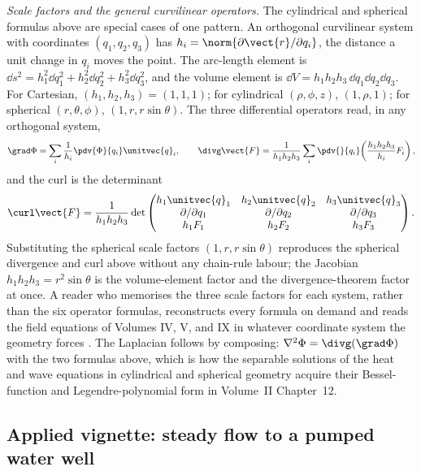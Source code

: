 \begin{mastery}
\textit{Scale factors and the general curvilinear operators.} The
cylindrical and spherical formulas above are special cases of one
pattern. An orthogonal curvilinear system with coordinates
$(q_{1}, q_{2}, q_{3})$ has 
$h_{i} = \norm{\partial\vect{r}/\partial q_{i}}$, the distance a unit
change in $q_{i}$ moves the point. The arc-length element is
$\dd s^{2} = h_{1}^{2}\dd q_{1}^{2} + h_{2}^{2}\dd q_{2}^{2} +
h_{3}^{2}\dd q_{3}^{2}$, and the volume element is
$\dd V = h_{1}h_{2}h_{3}\,\dd q_{1}\dd q_{2}\dd q_{3}$. For Cartesian,
$(h_{1}, h_{2}, h_{3}) = (1, 1, 1)$; for cylindrical $(\rho, \phi, z)$,
$(1, \rho, 1)$; for spherical $(r, \theta, \phi)$, $(1, r, r\sin\theta)$.
The three differential operators read, in any orthogonal system,
\[
\grad\Phi = \sum_{i}\frac{1}{h_{i}}\pdv{\Phi}{q_{i}}\unitvec{q}_{i},
\qquad
\divg\vect{F} = \frac{1}{h_{1}h_{2}h_{3}}\sum_{i}
  \pdv{}{q_{i}}\!\left(\frac{h_{1}h_{2}h_{3}}{h_{i}}F_{i}\right),
\]
and the curl is the determinant
\[
\curl\vect{F} = \frac{1}{h_{1}h_{2}h_{3}}\det
\begin{pmatrix}
h_{1}\unitvec{q}_{1} & h_{2}\unitvec{q}_{2} & h_{3}\unitvec{q}_{3} \\
\partial/\partial q_{1} & \partial/\partial q_{2} &
  \partial/\partial q_{3} \\
h_{1}F_{1} & h_{2}F_{2} & h_{3}F_{3}
\end{pmatrix}.
\]
Substituting the spherical scale factors $(1, r, r\sin\theta)$
reproduces the spherical divergence and curl above without any
chain-rule labour; the Jacobian $h_{1}h_{2}h_{3} = r^{2}\sin\theta$ is
the volume-element factor and the divergence-theorem factor at once. A
reader who memorises the three scale factors for each system, rather
than the six operator formulas, reconstructs every formula on demand
and reads the field equations of Volumes IV, V, and IX in whatever
coordinate system the geometry forces \cite{text:v2ch08-marsden-tromba-2012}.
The Laplacian follows by composing: $\nabla^{2}\Phi = \divg(\grad\Phi)$
with the two formulas above, which is how the separable solutions of
the heat and wave equations in cylindrical and spherical geometry
acquire their Bessel-function and Legendre-polynomial form in
Volume~II Chapter~12.
\end{mastery}

\subsection{Applied vignette: steady flow to a pumped water well}

